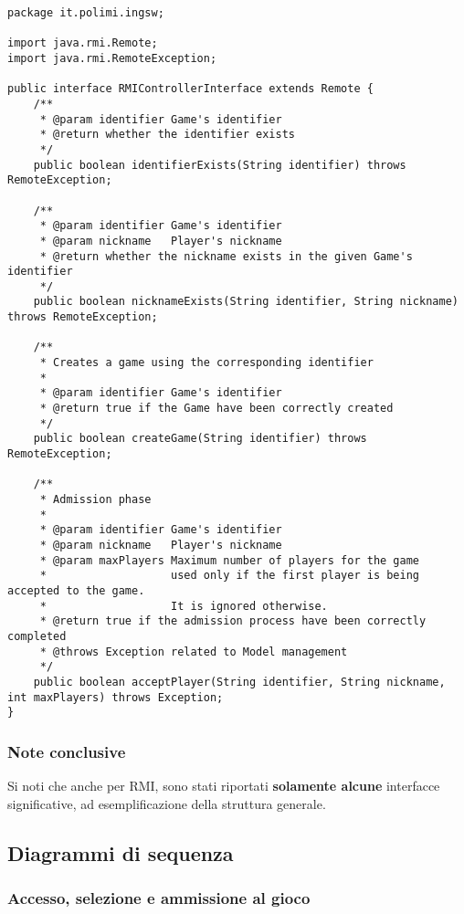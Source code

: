 \documentclass[a4paper,11pt]{article} %
\begin{document}
    \begin{verbatim}
package it.polimi.ingsw;

import java.rmi.Remote;
import java.rmi.RemoteException;

public interface RMIControllerInterface extends Remote {
    /**
     * @param identifier Game's identifier
     * @return whether the identifier exists
     */
    public boolean identifierExists(String identifier) throws RemoteException;

    /**
     * @param identifier Game's identifier
     * @param nickname   Player's nickname
     * @return whether the nickname exists in the given Game's identifier
     */
    public boolean nicknameExists(String identifier, String nickname) throws RemoteException;

    /**
     * Creates a game using the corresponding identifier
     *
     * @param identifier Game's identifier
     * @return true if the Game have been correctly created
     */
    public boolean createGame(String identifier) throws RemoteException;

    /**
     * Admission phase
     *
     * @param identifier Game's identifier
     * @param nickname   Player's nickname
     * @param maxPlayers Maximum number of players for the game
     *                   used only if the first player is being accepted to the game.
     *                   It is ignored otherwise.
     * @return true if the admission process have been correctly completed
     * @throws Exception related to Model management
     */
    public boolean acceptPlayer(String identifier, String nickname, int maxPlayers) throws Exception;
}
    \end{verbatim}

    \subsubsection{Note conclusive}
    Si noti che anche per RMI, sono stati riportati \textbf{solamente alcune} interfacce significative, ad esemplificazione della struttura generale.

    \newpage

    \subsection{Diagrammi di sequenza}\label{subsec:diagrammi-di-sequenza2}

    \subsubsection{Accesso, selezione e ammissione al gioco}
\end{document}
